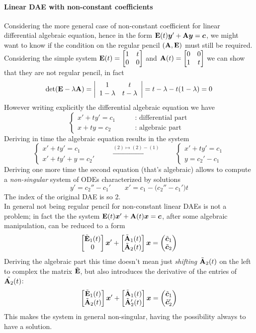	\paragraph{Linear DAE with non-constant coefficients} Considering the more general case of non-constant coefficient for linear differential algebraic equation, hence in the form $\mathbf{E}(t) \boldsymbol{y}' + \mathbf{A} \boldsymbol{y} = \boldsymbol{c}$, we might want to know if the condition on the regular pencil $(\mathbf{A},\mathbf{E})$ must still be required. Considering the simple system $\mathbf{E}(t) = \begin{bmatrix} 1 & t \\ 0 & 0 \end{bmatrix}$ and $\mathbf{A}(t) = \begin{bmatrix} 0 & 0 \\ 1 & t \end{bmatrix}$ we can show that they are not regular pencil, in fact
	\[ \det(\mathbf{E}-\lambda \mathbf{A}) = \left| \begin{array}{cc}
		1 & t \\ 1-\lambda& t - \lambda
	\end{array} \right| = t-\lambda - t(1-\lambda) = 0\]
	However writing explicitly the differential algebraic equation we have
	\[ \begin{cases}
		x' + t y' = c_1 \qquad & \textrm{: differential part} \\
		x + ty = c_2 & \textrm{: algebraic part}
	\end{cases} \]
	Deriving in time the algebraic equation results in the system
	\[ \begin{cases}
		x' + t y' = c_1 \\ x' + t y' + y = c_2'
	\end{cases} \qquad \xrightarrow{(2) \mapsto (2)-(1)} \qquad \begin{cases}
		x' + t y' = c_1 \\
		y = c_2'- c_1
	\end{cases}\]
	Deriving one more time the second equation (that's algebraic) allows to compute a \textit{non-singular} system of ODEs characterized by solutions
	\[ y' = c_2'' - c_1' \qquad x' = c_1 - \big(c_2''-c_1'\big)t \]	
	The index of the original DAE is so 2.\\
	In general not being regular pencil for non-constant linear DAEs is not a problem; in fact the the system $\mathbf{E}(t)\boldsymbol{x}' + \mathbf{A}(t) \boldsymbol{x} = \boldsymbol{c}$, after some algebraic manipulation, can be reduced to a form
	\[ \begin{bmatrix} \tilde{\mathbf{E}}_1(t) \\ 0  \end{bmatrix} \boldsymbol{x}' + \begin{bmatrix} \tilde{\mathbf{A}}_1(t) \\ \tilde{\mathbf{A}}_2(t)  \end{bmatrix} \boldsymbol{x} = \begin{pmatrix} \tilde{\boldsymbol{c}}_1 \\ \tilde{\boldsymbol{c}}_2  \end{pmatrix} \]
	Deriving the algebraic part this time doesn't mean just \textit{shifting} $\tilde{\mathbf{A}}_2(t)$ on the left to complex the matrix $\tilde{\mathbf{E}}$, but also introduces the derivative of the entries of $\tilde{\mathbf{A}_2}(t)$:
	\[ \begin{bmatrix} \tilde{\mathbf{E}}_1(t) \\ \tilde{\mathbf{A}}_2(t)  \end{bmatrix} \boldsymbol{x}' + \begin{bmatrix} \tilde{\mathbf{A}}_1(t) \\ \tilde{\mathbf{A}}_2'(t)  \end{bmatrix} \boldsymbol{x} = \begin{pmatrix} \tilde{\boldsymbol{c}}_1 \\ \tilde{\boldsymbol{c}}_2'  \end{pmatrix} \]
	This makes the system in general non-singular, having the possibility always to have a solution.
	
